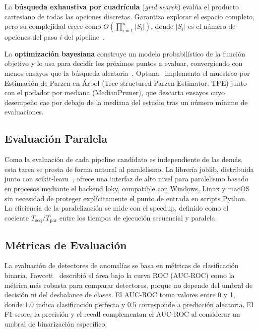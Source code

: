 \documentclass[conference,spanish]{IEEEtran}
\begin{document}
La \textbf{búsqueda exhaustiva por cuadrícula} (\textit{grid search})
evalúa el producto cartesiano de todas las opciones discretas. Garantiza
explorar el espacio completo, pero su complejidad crece como
$O\!\left(\prod_{i=1}^{n} |S_i|\right)$, donde $|S_i|$ es el número de
opciones del paso $i$ del pipeline~\cite{hastie2009elements}.

La \textbf{optimización bayesiana} construye un modelo probabilístico de la
función objetivo y lo usa para decidir los próximos puntos a evaluar,
convergiendo con menos ensayos que la búsqueda aleatoria~\cite{snoek2012practical}.
Optuna~\cite{akiba2019optuna} implementa el muestreo por Estimación de
Parzen en Árbol (Tree-structured Parzen Estimator, TPE) junto con
el podador por mediana (MedianPruner), que descarta ensayos cuyo
desempeño cae por debajo de la mediana del estudio tras un número mínimo de
evaluaciones.

\subsection{Evaluación Paralela}

Como la evaluación de cada pipeline candidato es independiente de las
demás, esta tarea se presta de forma natural al paralelismo. La librería
joblib, distribuida junto con
scikit-learn~\cite{pedregosa2011sklearn}, ofrece una interfaz de alto nivel
para paralelismo basado en procesos mediante el backend loky,
compatible con Windows, Linux y macOS sin necesidad de proteger
explícitamente el punto de entrada en scripts Python. La eficiencia de la
paralelización se mide con el speedup, definido como el cociente
$T_{\text{seq}} / T_{\text{par}}$ entre los tiempos de ejecución secuencial
y paralela.

\subsection{Métricas de Evaluación}

La evaluación de detectores de anomalías se basa en métricas de
clasificación binaria. Fawcett~\cite{fawcett2006roc} describió el área bajo
la curva ROC (AUC-ROC) como la métrica más robusta para comparar
detectores, porque no depende del umbral de decisión ni del desbalance de
clases. El AUC-ROC toma valores entre 0 y 1, donde 1.0 indica clasificación
perfecta y 0.5 corresponde a predicción aleatoria. El F1-score, la
precisión y el recall complementan el AUC-ROC al considerar un umbral de
binarización específico.
\end{document}
